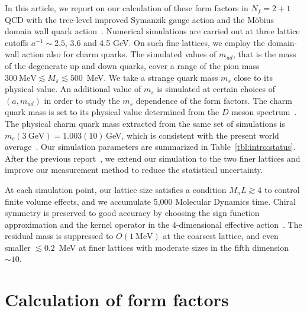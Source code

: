 \documentclass{PoS}
\begin{document}
In this article, 
we report on our calculation of these form factors in $N_f\!=\!2+1$ QCD
with the tree-level improved Symanzik gauge action
and the M\"obius domain wall quark action~\cite{MDWF}.
%
Numerical simulations are carried out at three lattice cutoffs
$a^{-1}\!\sim\!2.5$, 3.6 and 4.5 GeV.
On such fine lattices, we employ the domain-wall action
also for charm quarks.
%
The simulated values of $m_{ud}$, 
that is the mass of the degenerate up and down quarks,
cover a range of the pion mass 
$300~\mbox{MeV}\!\lesssim\!M_\pi\!\lesssim\!500$~MeV.
We take a strange quark mass $m_s$ close to its physical value.
An additional value of $m_s$ is simulated at certain choices of $(a,m_{ud})$
in order to study the $m_s$ dependence of the form factors.
The charm quark mass is set to its physical value 
determined from the $D$ meson spectrum~\cite{Lat15:Fahy}.
%
The physical charm quark mass extracted from the same set of 
simulations is $m_c(3~\mbox{GeV})\!=\!1.003(10)$\,GeV,
which is consistent with the present world average~\cite{mc:JLQCD}.
%
Our simulation parameters are summarized in Table~\ref{tbl:intro:status}.
%
After the previous report~\cite{Lat15:Suzuki},
we extend our simulation to the two finer lattices and 
improve our measurement method to reduce the statistical uncertainty.

At each simulation point, 
our lattice size satisfies a condition $M_\pi L \!\gtrsim\!4$ 
to control finite volume effects, 
and we accumulate 5,000 Molecular Dynamics time.
Chiral symmetry is preserved to good accuracy 
by choosing the sign function approximation and the kernel operator
in the 4-dimensional effective action~\cite{MDWF:JLQCD}.
The residual mass is suppressed to $O(1~\mbox{MeV})$ at the coarsest lattice,
and even smaller $\lesssim\!0.2$~MeV at finer lattices
with moderate sizes in the fifth dimension $\sim\!10$.



\section{Calculation of form factors}

\end{document}
